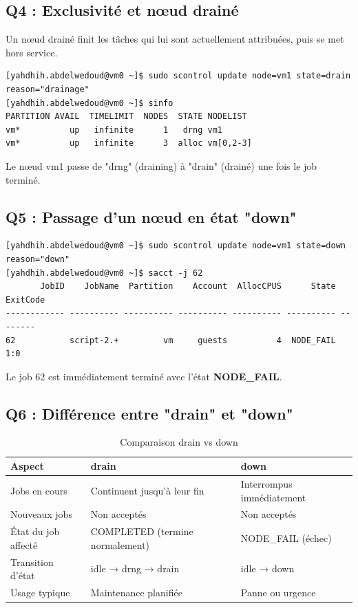 \documentclass[12pt,a4paper]{article}
\begin{document}
\subsection{Q4 : Exclusivité et nœud drainé}

Un nœud drainé finit les tâches qui lui sont actuellement attribuées, puis se met hors service.

\begin{lstlisting}
[yahdhih.abdelwedoud@vm0 ~]$ sudo scontrol update node=vm1 state=drain reason="drainage"
[yahdhih.abdelwedoud@vm0 ~]$ sinfo
PARTITION AVAIL  TIMELIMIT  NODES  STATE NODELIST
vm*          up   infinite      1   drng vm1
vm*          up   infinite      3  alloc vm[0,2-3]
\end{lstlisting}

Le nœud vm1 passe de "drng" (draining) à "drain" (drainé) une fois le job terminé.

\subsection{Q5 : Passage d'un nœud en état "down"}

\begin{lstlisting}
[yahdhih.abdelwedoud@vm0 ~]$ sudo scontrol update node=vm1 state=down reason="down"
[yahdhih.abdelwedoud@vm0 ~]$ sacct -j 62
       JobID    JobName  Partition    Account  AllocCPUS      State ExitCode 
------------ ---------- ---------- ---------- ---------- ---------- -------- 
62           script-2.+         vm     guests          4  NODE_FAIL      1:0 
\end{lstlisting}

Le job 62 est immédiatement terminé avec l'état \textbf{NODE\_FAIL}.

\subsection{Q6 : Différence entre "drain" et "down"}

\begin{table}[h]
\centering
\begin{tabular}{|l|p{5cm}|p{5cm}|}
\hline
\textbf{Aspect} & \textbf{drain} & \textbf{down} \\
\hline
Jobs en cours & Continuent jusqu'à leur fin & Interrompus immédiatement \\
Nouveaux jobs & Non acceptés & Non acceptés \\
État du job affecté & COMPLETED (termine normalement) & NODE\_FAIL (échec) \\
Transition d'état & idle → drng → drain & idle → down \\
Usage typique & Maintenance planifiée & Panne ou urgence \\
\hline
\end{tabular}
\caption{Comparaison drain vs down}
\end{table}
\end{document}
